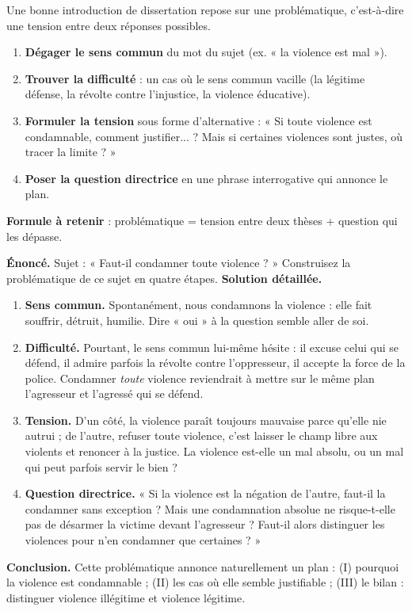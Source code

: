 \documentclass[11pt]{article}
\begin{document}
\begin{methode}
Une bonne introduction de dissertation repose sur une problématique, c'est-à-dire une tension entre deux réponses possibles.
\begin{enumerate}
\item \textbf{Dégager le sens commun} du mot du sujet (ex. « la violence est mal »).
\item \textbf{Trouver la difficulté} : un cas où le sens commun vacille (la légitime défense, la révolte contre l'injustice, la violence éducative).
\item \textbf{Formuler la tension} sous forme d'alternative : « Si toute violence est condamnable, comment justifier... ? Mais si certaines violences sont justes, où tracer la limite ? »
\item \textbf{Poser la question directrice} en une phrase interrogative qui annonce le plan.
\end{enumerate}
\textbf{Formule à retenir} : problématique = tension entre deux thèses + question qui les dépasse.
\end{methode}

\begin{exoresolu}
\textbf{Énoncé.} Sujet : « Faut-il condamner toute violence ? » Construisez la problématique de ce sujet en quatre étapes.
\tcblower
\textbf{Solution détaillée.}
\begin{enumerate}
\item \textbf{Sens commun.} Spontanément, nous condamnons la violence : elle fait souffrir, détruit, humilie. Dire « oui » à la question semble aller de soi.
\item \textbf{Difficulté.} Pourtant, le sens commun lui-même hésite : il excuse celui qui se défend, il admire parfois la révolte contre l'oppresseur, il accepte la force de la police. Condamner \emph{toute} violence reviendrait à mettre sur le même plan l'agresseur et l'agressé qui se défend.
\item \textbf{Tension.} D'un côté, la violence paraît toujours mauvaise parce qu'elle nie autrui ; de l'autre, refuser toute violence, c'est laisser le champ libre aux violents et renoncer à la justice. La violence est-elle un mal absolu, ou un mal qui peut parfois servir le bien ?
\item \textbf{Question directrice.} « Si la violence est la négation de l'autre, faut-il la condamner sans exception ? Mais une condamnation absolue ne risque-t-elle pas de désarmer la victime devant l'agresseur ? Faut-il alors distinguer les violences pour n'en condamner que certaines ? »
\end{enumerate}
\textbf{Conclusion.} Cette problématique annonce naturellement un plan : (I) pourquoi la violence est condamnable ; (II) les cas où elle semble justifiable ; (III) le bilan : distinguer violence illégitime et violence légitime.
\end{exoresolu}
\end{document}
